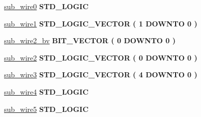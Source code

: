  \begin{DoxyCompactItemize}
\item 
\hyperlink{classpll_1_1_s_y_n_aca40f2d2e88330e7729fc8f89d1e2366}{sub\+\_\+wire0} {\bfseries \textcolor{comment}{S\+T\+D\+\_\+\+L\+O\+G\+I\+C}\textcolor{vhdlchar}{ }} 
\item 
\hyperlink{classpll_1_1_s_y_n_a325f96af17ccfcff0f437d73da993aff}{sub\+\_\+wire1} {\bfseries \textcolor{comment}{S\+T\+D\+\_\+\+L\+O\+G\+I\+C\+\_\+\+V\+E\+C\+T\+O\+R}\textcolor{vhdlchar}{ }\textcolor{vhdlchar}{(}\textcolor{vhdlchar}{ }\textcolor{vhdlchar}{ } \textcolor{vhdldigit}{1} \textcolor{vhdlchar}{ }\textcolor{keywordflow}{D\+O\+W\+N\+T\+O}\textcolor{vhdlchar}{ }\textcolor{vhdlchar}{ } \textcolor{vhdldigit}{0} \textcolor{vhdlchar}{ }\textcolor{vhdlchar}{)}\textcolor{vhdlchar}{ }} 
\item 
\hyperlink{classpll_1_1_s_y_n_abba109be51ad5c5e0095a8d5fe1e3c85}{sub\+\_\+wire2\+\_\+bv} {\bfseries \textcolor{comment}{B\+I\+T\+\_\+\+V\+E\+C\+T\+O\+R}\textcolor{vhdlchar}{ }\textcolor{vhdlchar}{(}\textcolor{vhdlchar}{ }\textcolor{vhdlchar}{ } \textcolor{vhdldigit}{0} \textcolor{vhdlchar}{ }\textcolor{keywordflow}{D\+O\+W\+N\+T\+O}\textcolor{vhdlchar}{ }\textcolor{vhdlchar}{ } \textcolor{vhdldigit}{0} \textcolor{vhdlchar}{ }\textcolor{vhdlchar}{)}\textcolor{vhdlchar}{ }} 
\item 
\hyperlink{classpll_1_1_s_y_n_a205f2292eed10dd71c2a24fab09e93ae}{sub\+\_\+wire2} {\bfseries \textcolor{comment}{S\+T\+D\+\_\+\+L\+O\+G\+I\+C\+\_\+\+V\+E\+C\+T\+O\+R}\textcolor{vhdlchar}{ }\textcolor{vhdlchar}{(}\textcolor{vhdlchar}{ }\textcolor{vhdlchar}{ } \textcolor{vhdldigit}{0} \textcolor{vhdlchar}{ }\textcolor{keywordflow}{D\+O\+W\+N\+T\+O}\textcolor{vhdlchar}{ }\textcolor{vhdlchar}{ } \textcolor{vhdldigit}{0} \textcolor{vhdlchar}{ }\textcolor{vhdlchar}{)}\textcolor{vhdlchar}{ }} 
\item 
\hyperlink{classpll_1_1_s_y_n_adf9c19689a8299f2f295de58153514e4}{sub\+\_\+wire3} {\bfseries \textcolor{comment}{S\+T\+D\+\_\+\+L\+O\+G\+I\+C\+\_\+\+V\+E\+C\+T\+O\+R}\textcolor{vhdlchar}{ }\textcolor{vhdlchar}{(}\textcolor{vhdlchar}{ }\textcolor{vhdlchar}{ } \textcolor{vhdldigit}{4} \textcolor{vhdlchar}{ }\textcolor{keywordflow}{D\+O\+W\+N\+T\+O}\textcolor{vhdlchar}{ }\textcolor{vhdlchar}{ } \textcolor{vhdldigit}{0} \textcolor{vhdlchar}{ }\textcolor{vhdlchar}{)}\textcolor{vhdlchar}{ }} 
\item 
\hyperlink{classpll_1_1_s_y_n_a1743b96eadf0499d106535e1a9241b2a}{sub\+\_\+wire4} {\bfseries \textcolor{comment}{S\+T\+D\+\_\+\+L\+O\+G\+I\+C}\textcolor{vhdlchar}{ }} 
\item 
\hyperlink{classpll_1_1_s_y_n_a428d095cdf1fa14d47c103e910135ebb}{sub\+\_\+wire5} {\bfseries \textcolor{comment}{S\+T\+D\+\_\+\+L\+O\+G\+I\+C}\textcolor{vhdlchar}{ }} 
\end{DoxyCompactItemize}
